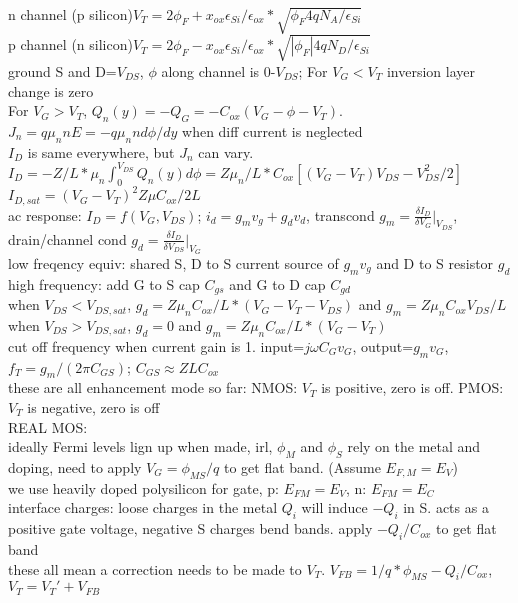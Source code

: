 \documentclass{article}
\begin{document}
\begin{large}
\\n channel (p silicon)$V_T=2\phi_F+x_{ox}\epsilon_{Si}/\epsilon_{ox} * \sqrt{\phi_F4qN_A/\epsilon_{Si}}$
\\p channel (n silicon)$V_T=2\phi_F-x_{ox}\epsilon_{Si}/\epsilon_{ox} * \sqrt{|\phi_F|4qN_D/\epsilon_{Si}}$
\\ground S and D=$V_{DS}$, $\phi$ along channel is $0$-$V_{DS}$; For $V_G<V_T$ inversion layer change is zero
\\For $V_G>V_T$, $Q_n(y)=-Q_G=-C_{ox}(V_G-\phi-V_T)$. $J_n=q\mu_nnE=-q\mu_nnd\phi/dy$ when diff current is neglected
\\$I_D$ is same everywhere, but $J_n$ can vary. $I_D=-Z/L*\mu_n\int_0^{V_{DS}}Q_n(y)d\phi=Z\mu_n/L *C_{ox}[(V_G-V_T)V_{DS}-V_{DS}^2/2]$
\\$I_{D,sat}=(V_G-V_T)^2Z\mu C_{ox}/2L$ 
\\ac response: $I_D=f(V_G,V_{DS})$; $i_d=g_mv_g+g_dv_d$, transcond $g_m=\frac{\delta I_D}{\delta V_G}|_{V_{DS}}$, drain/channel cond $g_d=\frac{\delta I_D}{\delta V_{DS}}|_{V_G}$
\\low freqency equiv: shared S, D to S current source of $g_mv_g$ and D to S resistor $g_d$
\\high frequency: add G to S cap $C_{gs}$ and G to D cap $C_{gd}$
\\when $V_{DS}<V_{DS,sat}$, $g_d=Z\mu_nC_{ox}/L*(V_G-V_T-V_{DS})$ and $g_m=Z\mu_nC_{ox}V_{DS}/L$
\\when $V_{DS}>V_{DS,sat}$, $g_d=0$ and $g_m=Z\mu_nC_{ox}/L*(V_G-V_T)$
\\cut off frequency when current gain is 1. input=$j\omega C_Gv_G$, output=$g_mv_G$, $f_T=g_m/(2\pi C_{GS})$; $C_{GS}\approx ZLC_{ox}$
\\these are all enhancement mode so far: NMOS: $V_T$ is positive, zero is off. PMOS: $V_T$ is negative, zero is off
\\REAL MOS:
\\ideally Fermi levels lign up when made, irl, $\phi_M$ and $\phi_S$ rely on the metal and doping, need to apply $V_G=\phi_{MS}/q$ to get flat band. (Assume $E_{F,M}=E_V$)
\\we use heavily doped polysilicon for gate, p: $E_{FM}=E_V$, n: $E_{FM}=E_C$
\\interface charges: loose charges in the metal $Q_i$ will induce $-Q_i$ in S. acts as a positive gate voltage, negative S charges bend bands. apply $-Q_i/C_{ox}$ to get flat band
\\these all mean a correction needs to be made to $V_T$. $V_{FB}=1/q *\phi_{MS}-Q_i/C_{ox}$, $V_T=V_T'+V_{FB}$

\end{large}
\end{document}
